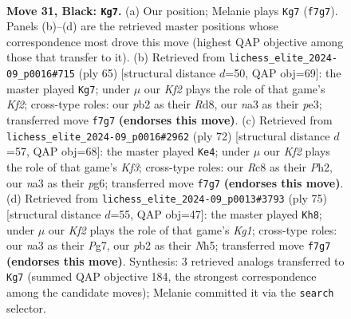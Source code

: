 \documentclass[11pt]{article}
\begin{document}
\clearpage

\begin{figure}[p]\centering
\begin{subfigure}{0.46\textwidth}\centering
\resizebox{\linewidth}{!}{%
\newchessgame
\chessboard[
  setfen={1rr5/5k1p/1p6/p4Q2/7P/N7/PP3PP1/R5K1 b - - 0 31},
  showmover=false,
  pgfstyle=straightmove, color=movearrow, markmove={f7-g7}
]}
\caption{}
\end{subfigure}\hfill
\begin{subfigure}{0.46\textwidth}\centering
\resizebox{\linewidth}{!}{%
\newchessgame
\chessboard[
  setfen={3r1r2/p4k2/1p6/3p1Q2/8/4P3/PP3P1P/7K b - - 3 33},
  showmover=false,
  pgfstyle=straightmove, color=movearrow, markmove={f7-g7}
]}
\caption{}
\end{subfigure}
\\[4pt]
\begin{subfigure}{0.46\textwidth}\centering
\resizebox{\linewidth}{!}{%
\newchessgame
\chessboard[
  setfen={Q7/pp1k1p2/3p2p1/8/8/1P2RK2/P6P/3q4 w - - 13 37},
  showmover=false,
  pgfstyle=straightmove, color=movearrow, markmove={f3-e4}
]}
\caption{}
\end{subfigure}\hfill
\begin{subfigure}{0.46\textwidth}\centering
\resizebox{\linewidth}{!}{%
\newchessgame
\chessboard[
  setfen={4r1k1/p5p1/8/3Q2Pn/4r3/1P6/P6P/5RK1 b - - 2 38},
  showmover=false,
  pgfstyle=straightmove, color=movearrow, markmove={g8-h8}
]}
\caption{}
\end{subfigure}
\caption{\textbf{Move 31, Black: \texttt{Kg7}.} (a) Our position; Melanie plays \texttt{Kg7} (\texttt{f7g7}). Panels (b)--(d) are the retrieved master positions whose correspondence most drove this move (highest QAP objective among those that transfer to it). (b) Retrieved from \texttt{lichess\_elite\_2024-09\_p0016\#715} (ply 65) [structural distance $d$=50, QAP obj=69]: the master played \texttt{Kg7}; under $\mu$ our \emph{Kf2} plays the role of that game's \emph{Kf2}; cross-type roles: our \emph{p}b2 as their \emph{R}d8, our \emph{n}a3 as their \emph{p}e3; transferred move \texttt{f7g7} \textbf{(endorses this move)}. (c) Retrieved from \texttt{lichess\_elite\_2024-09\_p0016\#2962} (ply 72) [structural distance $d$=57, QAP obj=68]: the master played \texttt{Ke4}; under $\mu$ our \emph{Kf2} plays the role of that game's \emph{Kf3}; cross-type roles: our \emph{R}c8 as their \emph{P}h2, our \emph{n}a3 as their \emph{p}g6; transferred move \texttt{f7g7} \textbf{(endorses this move)}. (d) Retrieved from \texttt{lichess\_elite\_2024-09\_p0013\#3793} (ply 75) [structural distance $d$=55, QAP obj=47]: the master played \texttt{Kh8}; under $\mu$ our \emph{Kf2} plays the role of that game's \emph{Kg1}; cross-type roles: our \emph{n}a3 as their \emph{P}g7, our \emph{p}b2 as their \emph{N}h5; transferred move \texttt{f7g7} \textbf{(endorses this move)}. Synthesis: 3 retrieved analogs transferred to \texttt{Kg7} (summed QAP objective 184, the strongest correspondence among the candidate moves); Melanie committed it via the \texttt{search} selector.}
\label{fig:thought-m61}
\end{figure}
\end{document}
